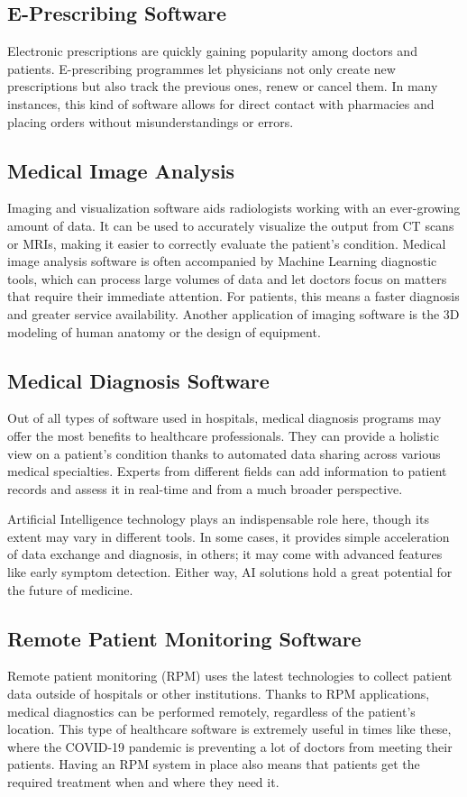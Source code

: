 \documentclass[11pt,a4paper,twoside]{article}
\begin{document}
\subsection{E-Prescribing Software}
Electronic prescriptions are quickly gaining popularity among doctors and patients. E-prescribing programmes let physicians not only create new prescriptions but also track the previous ones, renew or cancel them. In many instances, this kind of software allows for direct contact with pharmacies and placing orders without misunderstandings or errors.
\subsection{Medical Image Analysis}
Imaging and visualization software aids radiologists working with an ever-growing amount of data. It can be used to accurately visualize the output from CT scans or MRIs, making it easier to correctly evaluate the patient’s condition. Medical image analysis software is often accompanied by Machine Learning diagnostic tools, which can process large volumes of data and let doctors focus on matters that require their immediate attention. For patients, this means a faster diagnosis and greater service availability. Another application of imaging software is the 3D modeling of human anatomy or the design of equipment.
\subsection{Medical Diagnosis Software}
Out of all types of software used in hospitals, medical diagnosis programs may offer the most benefits to healthcare professionals. They can provide a holistic view on a patient’s condition thanks to automated data sharing across various medical specialties. Experts from different fields can add information to patient records and assess it in real-time and from a much broader perspective.\par
Artificial Intelligence technology plays an indispensable role here, though its extent may vary in different tools. In some cases, it provides simple acceleration of data exchange and diagnosis, in others; it may come with advanced features like early symptom detection. Either way, AI solutions hold a great potential for the future of medicine.
\subsection{Remote Patient Monitoring Software}
Remote patient monitoring (RPM) uses the latest technologies to collect patient data outside of hospitals or other institutions. Thanks to RPM applications, medical diagnostics can be performed remotely, regardless of the patient’s location. This type of healthcare software is extremely useful in times like these, where the COVID-19 pandemic is preventing a lot of doctors from meeting their patients. Having an RPM system in place also means that patients get the required treatment when and where they need it.
\end{document}
